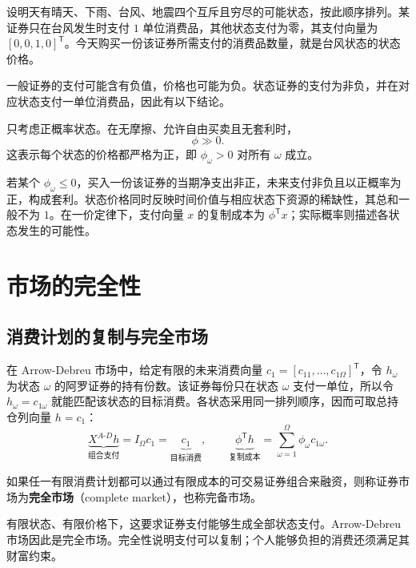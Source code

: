\begin{tcolorbox}[example,title=课堂例题：只在台风状态支付的证券]
设明天有晴天、下雨、台风、地震四个互斥且穷尽的可能状态，按此顺序排列。某证券只在台风发生时支付 $1$ 单位消费品，其他状态支付为零，其支付向量为 $[0,0,1,0]^{\mathsf T}$。今天购买一份该证券所需支付的消费品数量，就是台风状态的状态价格。
\end{tcolorbox}
一般证券的支付可能含有负值，价格也可能为负。状态证券的支付为非负，并在对应状态支付一单位消费品，因此有以下结论。

\begin{tcolorbox}[knowledge,title=状态价格的正性]
只考虑正概率状态。在无摩擦、允许自由买卖且无套利时，
\begin{equation}
 \phi\gg0.\label{eq:wj-three-positive-price}
\end{equation}
这表示每个状态的价格都严格为正，即 $\phi_\omega>0$ 对所有 $\omega$ 成立。
\end{tcolorbox}

若某个 $\phi_\omega\le0$，买入一份该证券的当期净支出非正，未来支付非负且以正概率为正，构成套利。状态价格同时反映时间价值与相应状态下资源的稀缺性，其总和一般不为 $1$。在一价定律下，支付向量 $x$ 的复制成本为 $\phi^{\mathsf T}x$；实际概率则描述各状态发生的可能性。

\section{市场的完全性}
\subsection{消费计划的复制与完全市场}
在 Arrow-Debreu 市场中，给定有限的未来消费向量 $c_1=[c_{11},\ldots,c_{1\Omega}]^{\mathsf T}$，令 $h_\omega$ 为状态 $\omega$ 的阿罗证券的持有份数。该证券每份只在状态 $\omega$ 支付一单位，所以令 $h_\omega=c_{1\omega}$ 就能匹配该状态的目标消费。各状态采用同一排列顺序，因而可取总持仓列向量 $h=c_1$：
\[
 \underbrace{X^{A\text{-}D}h}_{\text{组合支付}}=I_\Omega c_1
 =\underbrace{c_1}_{\text{目标消费}},\qquad
 \underbrace{\phi^{\mathsf T}h}_{\text{复制成本}}=\sum_{\omega=1}^{\Omega}\phi_\omega c_{1\omega}.
\]
\begin{tcolorbox}[knowledge]
如果任一有限消费计划都可以通过有限成本的可交易证券组合来融资，则称证券市场为\textbf{完全市场}（complete market），也称完备市场。
\end{tcolorbox}
有限状态、有限价格下，这要求证券支付能够生成全部状态支付。Arrow-Debreu 市场因此是完全市场。完全性说明支付可以复制；个人能够负担的消费还须满足其财富约束。

